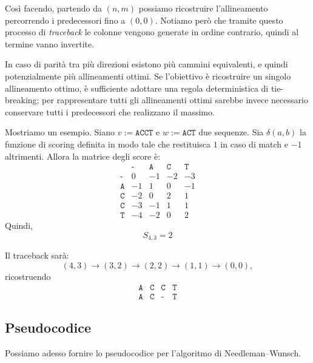 Così facendo, partendo da $(n,m)$ possiamo ricostruire l'allineamento percorrendo i predecessori fino a $(0,0)$.
Notiamo però che tramite questo processo di \emph{traceback} le colonne vengono generate in ordine contrario, quindi al termine vanno invertite.

In caso di parità tra più direzioni esistono più cammini equivalenti, e quindi potenzialmente più allineamenti ottimi.
Se l'obiettivo è ricostruire un singolo allineamento ottimo, è sufficiente adottare una regola deterministica di tie-breaking;
per rappresentare tutti gli allineamenti ottimi sarebbe invece necessario conservare tutti i predecessori che realizzano il massimo.

Mostriamo un esempio.
Siano $v:=\texttt{ACCT}$ e $w:=\texttt{ACT}$ due sequenze.
Sia $\delta(a,b)$ la funzione di scoring definita in modo tale che restituisca $1$ in caso di match e $-1$ altrimenti.
Allora la matrice degli score è:
\[
    \begin{array}{c|rrrr}
           & \texttt{-} & \texttt{A} & \texttt{C} & \texttt{T}\\
        \hline
        \texttt{-} & 0  & -1 & -2 & -3\\
        \texttt{A} & -1 & 1  & 0  & -1\\
        \texttt{C} & -2 & 0  & 2  & 1\\
        \texttt{C} & -3 & -1 & 1  & 1\\
        \texttt{T} & -4 & -2 & 0  & 2
    \end{array}
\]
Quindi,
\[
    S_{4,3} = 2
\]

Il traceback sarà:
\[
    (4,3) \to (3,2) \to (2,2) \to (1,1) \to (0,0),
\]
ricostruendo
\[
    \begin{matrix}
        \texttt{A} & \texttt{C} & \texttt{C} & \texttt{T} \\
        \texttt{A} & \texttt{C} & \texttt{-} & \texttt{T}
    \end{matrix}
\]


\subsection{Pseudocodice}
\label{sec:NW-pseudocodice}

Possiamo adesso fornire lo pseudocodice per l'algoritmo di Needleman--Wunsch.

